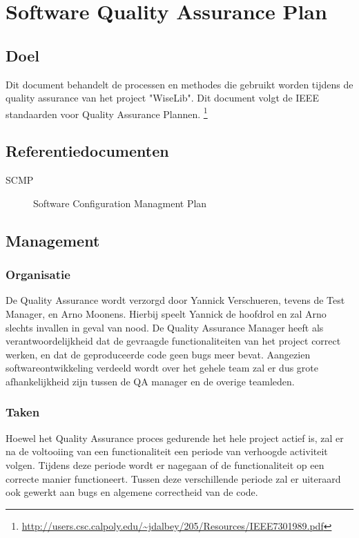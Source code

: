 \section{Software Quality Assurance Plan}
\label{sec:SQAP}
\subsection{Doel}

Dit document behandelt de processen en methodes die gebruikt worden tijdens de quality assurance van het project "WiseLib". Dit document volgt de IEEE standaarden voor Quality Assurance Plannen.
\footnote{\url{http://users.csc.calpoly.edu/~jdalbey/205/Resources/IEEE7301989.pdf}}

\subsection{Referentiedocumenten}

\begin{description}
\item [SCMP] Software Configuration Managment Plan
\end{description}

\subsection{Management}

\subsubsection{Organisatie}

De Quality Assurance wordt verzorgd door Yannick Verschueren, tevens de Test Manager, en Arno Moonens. Hierbij speelt Yannick de hoofdrol en zal Arno slechts invallen in geval van nood. De Quality Assurance Manager heeft als verantwoordelijkheid dat de gevraagde functionaliteiten van het project correct werken, en dat de geproduceerde code geen bugs meer bevat. Aangezien softwareontwikkeling verdeeld wordt over het gehele team zal er dus grote afhankelijkheid zijn tussen de QA manager en de overige teamleden.

\subsubsection{Taken}

Hoewel het Quality Assurance proces gedurende het hele project actief is, zal er na de voltooiing van een functionaliteit een periode van verhoogde activiteit volgen. Tijdens deze periode wordt er nagegaan of de functionaliteit op een correcte manier functioneert.
Tussen deze verschillende periode zal er uiteraard ook gewerkt aan bugs en algemene correctheid van de code.

